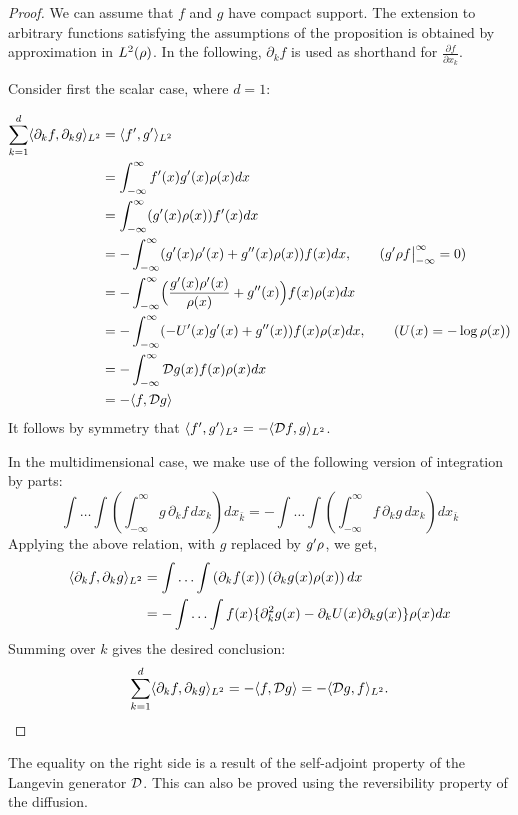 \begin{proof}[Proof]
	We can assume that $f$ and $g$ have compact support. The extension to arbitrary functions satisfying the assumptions of the proposition is obtained by approximation in $L^2(\rho)$. In the following, $\partial_k f$ is used as shorthand for $\frac{\partial f}{\partial x_k}$.  
	
	Consider first the scalar case, where $d=1$: 
	
	\begin{equation}
	\begin{aligned}
	\sum_{k=1}^d \langle \partial_k f,  \partial_k g\rangle_{L^2}&= \langle f', g' \rangle_{L^2}\\
	&= \int_{-\infty}^{\infty} f'(x)g'(x)\rho(x)dx \\
	&= \int_{-\infty}^{\infty} (g'(x) \rho(x)) f'(x)dx \\
	&= -\int_{-\infty}^{\infty}(g'(x) \rho'(x) +g''(x) \rho(x)) f(x) dx, \qquad{ (g'\rho f \big|_{-\infty}^{\infty}=0) }\\
	&= -\int_{-\infty}^{\infty}\Bigl(\frac{g'(x) \rho'(x)}{\rho(x)}+g''(x)\Bigr) f(x) \rho(x) dx \\
	&= -\int_{-\infty}^{\infty}(-U'(x) g'(x) + g''(x))  f(x) \rho(x) dx, \qquad ( U(x) = -\log \rho(x) )\\
	&= -\int_{-\infty}^{\infty} {\cal D} g (x) f(x) \rho(x) dx \\
	&= -\langle f, {\cal D} g \rangle
	\end{aligned}
	\end{equation}
	It follows by symmetry that $\langle f', g' \rangle_{L^2} = - \langle {\cal D} f, g \rangle_{L^2}$.  
	
	In the multidimensional case, we make use of the following version of integration by parts:
	\begin{equation}
	\int \hdots \int \left(\int_{-\infty}^{\infty} g \, \partial_k f \, dx_k\right) dx_{\bar{k}} = -\int \hdots \int \left(\int_{-\infty}^{\infty} f\, \partial_k g \, dx_k\right) dx_{\bar{k}}
	\end{equation}
	Applying the above relation, with $g$ replaced by $g'\rho$, we get, 
	\begin{equation}
	\begin{aligned}
	\langle \partial_k f, \partial_k g \rangle_{L^2} &= \int \hdots \int \left(\partial_k f(x)\right)\left(\partial_k g(x)\rho(x)\right)dx\\
	&= -\int \hdots \int f(x)\{\partial_k^2 g(x)-\partial_k U(x)\partial_k g(x)\}\rho(x)dx\\
	\end{aligned}
	\end{equation}
	Summing over $k$ gives the desired conclusion:
	\begin{equation}
	\sum_{k=1}^{d} \langle\partial_k f, \partial_k g\rangle_{L^2}= -\langle f, {\cal D} g\rangle = - \langle {\cal D} g, f \rangle_{L^2}. 
	\end{equation}
\end{proof}
The equality on the right side is a result of the self-adjoint property of the Langevin generator ${\cal D}$. This can also be proved using the reversibility property of the diffusion.
